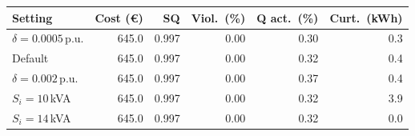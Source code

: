 \begin{tabular}{@{}lrrrrr@{}}
\toprule
Setting & Cost (\euro) & SQ & Viol.\ (\%) & Q act.\ (\%) & Curt.\ (kWh) \\
\midrule
$\delta = 0.0005$\,p.u. & 645.0 & 0.997 & 0.00 & 0.30 & 0.3 \\
Default & 645.0 & 0.997 & 0.00 & 0.32 & 0.4 \\
$\delta = 0.002$\,p.u. & 645.0 & 0.997 & 0.00 & 0.37 & 0.4 \\
$S_i = 10$\,kVA & 645.0 & 0.997 & 0.00 & 0.32 & 3.9 \\
$S_i = 14$\,kVA & 645.0 & 0.997 & 0.00 & 0.32 & 0.0 \\
\bottomrule
\end{tabular}
